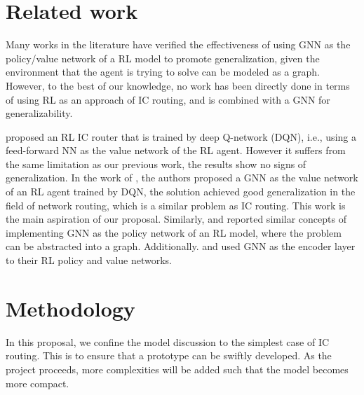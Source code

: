 \documentclass[letterpaper]{article}
\begin{document}




\section{Related work}
Many works in the literature have verified the effectiveness of using GNN as the policy/value network of a RL model to promote generalization, given the environment that the agent is trying to solve can be modeled as a graph. However, to the best of our knowledge, no work has been directly done in terms of using RL as an approach of IC routing, and is combined with a GNN for generalizability.

\cite{Liao2020} proposed an RL IC router that is trained by deep Q-network (DQN), i.e., using a feed-forward NN as the value network of the RL agent. However it suffers from the same limitation as our previous work, the results show no signs of generalization. In the work of \cite{Almasan2022}, the authors proposed a GNN as the value network of an RL agent trained by DQN, the solution achieved good generalization in the field of network routing, which is a similar problem as IC routing. This work is the main aspiration of our proposal. Similarly, \cite{Chen2023} and \cite{Wang2018} reported similar concepts of implementing GNN as the policy network of an RL model, where the problem can be abstracted into a graph. Additionally. \cite{Mirhoseini2021} and \cite{Yue2022} used GNN as the encoder layer to their RL policy and value networks. 
    
\section{Methodology}
\label{method}
In this proposal, we confine the model discussion to the simplest case of IC routing. This is to ensure that a prototype can be swiftly developed. As the project proceeds, more complexities will be added such that the model becomes more compact.
\end{document}
